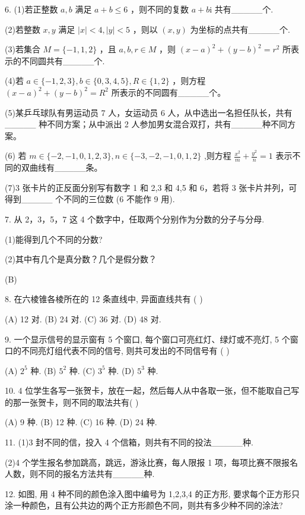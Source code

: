\documentclass[10pt]{article}
\begin{document}
6. (1)若正整数 \(a,b\) 满足 \(a + b \leq  6\) ，则不同的复数 \(a + b\mathrm{i}\) 共有\_\_\_\_\_个.

(2)若整数 \(x,y\) 满足 \(\left| x\right|  < 4,\left| y\right|  < 5\) ，则以 \(\left( {x,y}\right)\) 为坐标的点共有\_\_\_\_\_个.

(3)若集合 \(M = \{  - 1,1,2\}\) ，且 \(a,b,r \in  M\) ，则 \({\left( x - a\right) }^{2} + {\left( y - b\right) }^{2} = {r}^{2}\) 所表示的不同圆共有\_\_\_\_\_个.

(4)若 \(a \in  \{  - 1,2,3\} ,b \in  \{ 0,3,4,5\} ,R \in  \{ 1,2\}\) ，则方程 \({\left( x - a\right) }^{2} + {\left( y - b\right) }^{2} = {R}^{2}\) 所表示的不同圆有\_\_\_\_\_个。

(5)某乒乓球队有男运动员 7 人，女运动员 6 人，从中选出一名担任队长，共有\_\_\_\_\_ 种不同方案；从中派出 2 人参加男女混合双打，共有\_\_\_\_\_种不同方案。

(6) 若 \(m \in  \{  - 2, - 1,0,1,2,3\} ,n \in  \{  - 3, - 2, - 1,0,1,2\}\) ,则方程 \(\frac{{x}^{2}}{m} + \frac{{y}^{2}}{n} = 1\) 表示不同的双曲线有\_\_\_\_\_条。

(7)3 张卡片的正反面分别写有数字 1 和 2,3 和 4,5 和 6，若将 3 张卡片并列，可得到\_\_\_\_\_ 个不同的三位数 (6 不能作 9 用).

7. 从 2，3，5，7 这 4 个数字中，任取两个分别作为分数的分子与分母.

(1)能得到几个不同的分数?

(2)其中有几个是真分数？几个是假分数？

(B)

8. 在六棱锥各棱所在的 12 条直线中, 异面直线共有 ( )

(A) 12 对. (B) 24 对. (C) 36 对. (D) 48 对.

9. 一个显示信号的显示窗有 5 个窗口, 每个窗口可亮红灯、绿灯或不亮灯, 5 个窗口的不同亮灯组代表不同的信号, 则共可发出的不同信号有 ( )

(A) \({2}^{5}\) 种. (B) \({5}^{2}\) 种. (C) \({3}^{5}\) 种. (D) \({5}^{3}\) 种.

10. 4 位学生各写一张贺卡，放在一起，然后每人从中各取一张，但不能取自己写的那一张贺卡，则不同的取法共有( )

(A) 9 种. (B) 12 种. (C) 16 种. (D) 24 种.

11. (1)3 封不同的信，投入 4 个信箱，则共有不同的投法\_\_\_\_\_种.

(2)4 个学生报名参加跳高，跳远，游泳比赛，每人限报 1 项，每项比赛不限报名人数，则不同的报名方法共有\_\_\_\_\_种.

12. 如图, 用 4 种不同的颜色涂入图中编号为 1,2,3,4 的正方形, 要求每个正方形只涂一种颜色，且有公共边的两个正方形颜色不同，则共有多少种不同的涂法?
\end{document}
